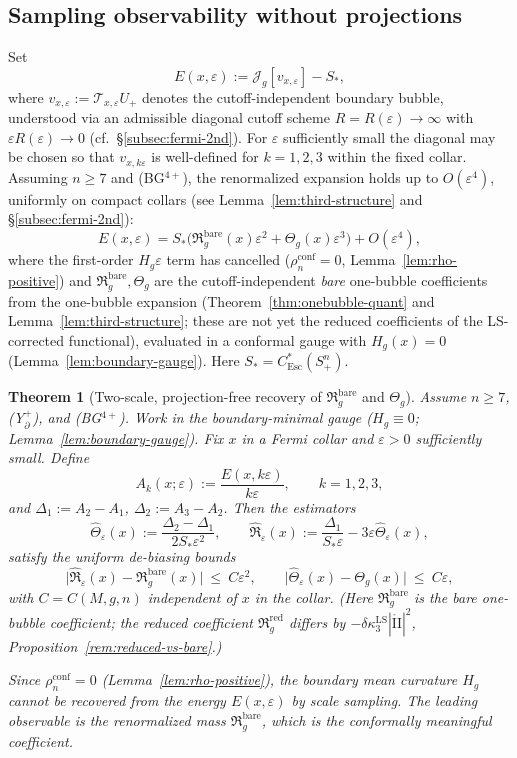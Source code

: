 \documentclass[11pt,reqno,a4paper]{amsart}
\numberwithin{equation}{section}
\theoremstyle{plain}
\newtheorem{theorem}{Theorem}[section]
\theoremstyle{remark}
\theoremstyle{plain}
\begin{document}
\subsection{Sampling observability without projections}\label{subsec:sampling-observability}
Set
\[
E(x,\varepsilon):=\mathcal J_g[v_{x,\varepsilon}]-S_\ast,
\]
where $v_{x,\varepsilon}:=\mathcal T_{x,\varepsilon}U_+$ denotes the cutoff-independent boundary bubble,
understood via an admissible diagonal cutoff scheme $R=R(\varepsilon)\to\infty$ with $\varepsilon R(\varepsilon)\to0$
(cf.\ \S\ref{subsec:fermi-2nd}). For $\varepsilon$ sufficiently small the diagonal may be chosen so that
$v_{x,k\varepsilon}$ is well-defined for $k=1,2,3$ within the fixed collar.
Assuming $n\ge7$ and \textup{(BG$^{4+}$)}, the renormalized expansion holds up to $O(\varepsilon^4)$, uniformly on compact collars (see Lemma~\ref{lem:third-structure} and \S\ref{subsec:fermi-2nd}):
\[
E(x,\varepsilon)=S_\ast\Big(\mathfrak R_g^{\mathrm{bare}}(x)\varepsilon^2+\Theta_g(x)\varepsilon^3\Big)+O(\varepsilon^4),
\]
where the first-order $H_g\varepsilon$ term has cancelled ($\rho_n^{\mathrm{conf}}=0$, Lemma~\ref{lem:rho-positive}) and $\mathfrak R_g^{\mathrm{bare}},\Theta_g$ are the cutoff-independent \emph{bare} one-bubble coefficients from the one-bubble expansion (Theorem~\ref{thm:onebubble-quant} and Lemma~\ref{lem:third-structure}; these are not yet the reduced coefficients of the LS-corrected functional), evaluated in a conformal gauge with $H_g(x)=0$ (Lemma~\ref{lem:boundary-gauge}). Here $S_\ast=C_{\mathrm{Esc}}^*(S^n_+)$.


\begin{theorem}[Two-scale, projection-free recovery of $\mathfrak R_g^{\mathrm{bare}}$ and $\Theta_g$]\label{thm:sampling-observability}
Assume $n\ge7$, \textup{(Y$^+_{\partial}$)}, and \textup{(BG$^{4+}$)}. Work in the boundary-minimal gauge ($H_g\equiv0$; Lemma~\ref{lem:boundary-gauge}).
Fix $x$ in a Fermi collar and $\varepsilon>0$ sufficiently small. Define
\[
A_k(x;\varepsilon):=\frac{E(x,k\varepsilon)}{k\varepsilon},\qquad k=1,2,3,
\]
and $\Delta_1:=A_2-A_1$, $\Delta_2:=A_3-A_2$. Then the estimators
\[
\widehat\Theta_\varepsilon(x):=\frac{\Delta_2-\Delta_1}{2S_\ast\varepsilon^2},\qquad
\widehat{\mathfrak R}_\varepsilon(x):=\frac{\Delta_1}{S_\ast\varepsilon}-3\varepsilon\widehat\Theta_\varepsilon(x),
\]
satisfy the uniform de-biasing bounds
\[
\big|\widehat{\mathfrak R}_\varepsilon(x)-\mathfrak R_g^{\mathrm{bare}}(x)\big|\ \le\ C\varepsilon^2,\qquad
\big|\widehat\Theta_\varepsilon(x)-\Theta_g(x)\big|\ \le\ C\varepsilon,
\]
with $C=C(M,g,n)$ independent of $x$ in the collar.
(Here $\mathfrak R_g^{\mathrm{bare}}$ is the bare one-bubble coefficient;
the reduced coefficient $\mathfrak R_g^{\mathrm{red}}$ differs by
$-\delta\kappa_3^{\mathrm{LS}}|\mathring{\mathrm{II}}|^2$,
Proposition~\ref{rem:reduced-vs-bare}.)

Since $\rho_n^{\mathrm{conf}}=0$ (Lemma~\ref{lem:rho-positive}), the boundary mean curvature
$H_g$ cannot be recovered from the energy $E(x,\varepsilon)$ by scale sampling.
The leading observable is the renormalized mass $\mathfrak R_g^{\mathrm{bare}}$, which is the
conformally meaningful coefficient.
\end{theorem}
\end{document}
